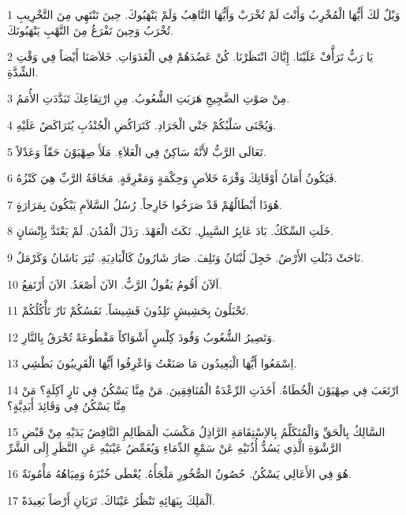\par 1 وَيْلٌ لَكَ أَيُّهَا الْمُخْرِبُ وَأَنْتَ لَمْ تُخْرَبْ وَأَيُّهَا النَّاهِبُ وَلَمْ يَنْهَبُوكَ. حِينَ تَنْتَهِي مِنَ التَّخْرِيبِ تُخْرَبُ وَحِينَ تَفْرَغُ مِنَ النَّهْبِ يَنْهَبُونَكَ.
\par 2 يَا رَبُّ تَرَأَّفْ عَلَيْنَا. إِيَّاكَ انْتَظَرْنَا. كُنْ عَضُدَهُمْ فِي الْغَدَوَاتِ. خَلاَصَنَا أَيْضاً فِي وَقْتِ الشِّدَّةِ.
\par 3 مِنْ صَوْتِ الضَّجِيجِ هَرَبَتِ الشُّعُوبُ. مِنِ ارْتِفَاعِكَ تَبَدَّدَتِ الأُمَمُ.
\par 4 وَيُجْنَى سَلْبُكُمْ جَنْي الْجَرَادِ. كَتَرَاكُضِ الْجُنْدُبِ يُتَرَاكَضُ عَلَيْهِ.
\par 5 تَعَالَى الرَّبُّ لأَنَّهُ سَاكِنٌ فِي الْعَلاَءِ. مَلَأَ صِهْيَوْنَ حَقّاً وَعَدْلاً.
\par 6 فَيَكُونُ أَمَانُ أَوْقَاتِكَ وَفْرَةَ خَلاَصٍ وَحِكْمَةٍ وَمَعْرِفَةٍ. مَخَافَةُ الرَّبِّ هِيَ كَنْزُهُ.
\par 7 هُوَذَا أَبْطَالُهُمْ قَدْ صَرَخُوا خَارِجاً. رُسُلُ السَّلاَمِ يَبْكُونَ بِمَرَارَةٍ.
\par 8 خَلَتِ السِّكَكُ. بَادَ عَابِرُ السَّبِيلِ. نَكَثَ الْعَهْدَ. رَذَلَ الْمُدُنَ. لَمْ يَعْتَدَّ بِإِنْسَانٍ.
\par 9 نَاحَتْ ذَبُلَتِ الأَرْضُ. خَجِلَ لُبْنَانُ وَتَلِفَ. صَارَ شَارُونُ كَالْبَادِيَةِ. نُثِرَ بَاشَانُ وَكَرْمَلُ.
\par 10 اَلآنَ أَقُومُ يَقُولُ الرَّبُّ. الآنَ أَصْعَدُ. الآنَ أَرْتَفِعُ.
\par 11 تَحْبَلُونَ بِحَشِيشٍ تَلِدُونَ قَشِيشاً. نَفَسُكُمْ نَارٌ تَأْكُلُكُمْ.
\par 12 وَتَصِيرُ الشُّعُوبُ وَقُودَ كِلْسٍ أَشْوَاكاً مَقْطُوعَةً تُحْرَقُ بِالنَّارِ.
\par 13 اِسْمَعُوا أَيُّهَا الْبَعِيدُون مَا صَنَعْتُ وَاعْرِفُوا أَيُّهَا الْقَرِيبُونَ بَطْشِي.
\par 14 ارْتَعَبَ فِي صِهْيَوْنَ الْخُطَاةُ. أَخَذَتِ الرِّعْدَةُ الْمُنَافِقِينَ. مَنْ مِنَّا يَسْكُنُ فِي نَارٍ آكِلَةٍ؟ مَنْ مِنَّا يَسْكُنُ فِي وَقَائِدَ أَبَدِيَّةٍ؟
\par 15 السَّالِكُ بِالْحَقِّ وَالْمُتَكَلِّمُ بِالاِسْتِقَامَةِ الرَّاذِلُ مَكْسَبَ الْمَظَالِمِ النَّافِضُ يَدَيْهِ مِنْ قَبْضِ الرَّشْوَةِ الَّذِي يَسُدُّ أُذُنَيْهِ عَنْ سَمْعِ الدِّمَاءِ وَيُغَمِّضُ عَيْنَيْهِ عَنِ النَّظَرِ إِلَى الشَّرِّ
\par 16 هُوَ فِي الأَعَالِي يَسْكُنُ. حُصُونُ الصُّخُورِ مَلْجَأُهُ. يُعْطَى خُبْزَهُ وَمِيَاهُهُ مَأْمُونَةٌ.
\par 17 اَلْمَلِكَ بِبَهَائِهِ تَنْظُرُ عَيْنَاكَ. تَرَيَانِ أَرْضاً بَعِيدَةً.
